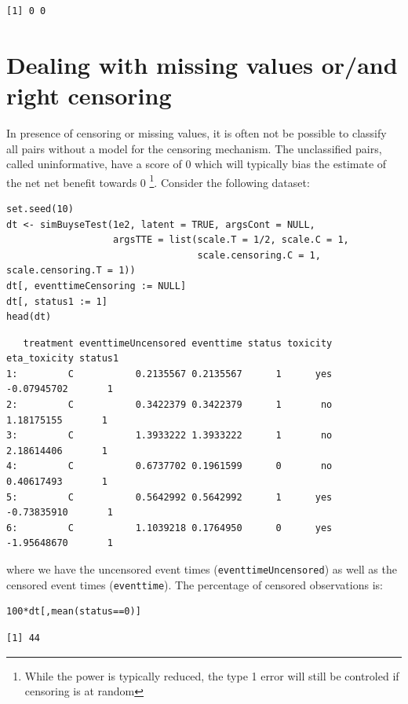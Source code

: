 \documentclass[12pt]{article}
\begin{document}
\begin{verbatim}
[1] 0 0
\end{verbatim}


\clearpage

\section{Dealing with missing values or/and right censoring}
\label{sec:org2e55876}

In presence of censoring or missing values, it is often not be
 possible to classify all pairs without a model for the censoring
 mechanism. The unclassified pairs, called uninformative, have a score
 of 0 which will typically bias the estimate of the net net benefit
 towards 0 \footnote{While the power is typically reduced, the type 1 error
 will still be controled if censoring is at random}. Consider the
 following dataset:
\lstset{language=r,label= ,caption= ,captionpos=b,numbers=none}
\begin{lstlisting}
set.seed(10)
dt <- simBuyseTest(1e2, latent = TRUE, argsCont = NULL,
                   argsTTE = list(scale.T = 1/2, scale.C = 1,
                                  scale.censoring.C = 1, scale.censoring.T = 1))
dt[, eventtimeCensoring := NULL]
dt[, status1 := 1]
head(dt)
\end{lstlisting}

\begin{verbatim}
   treatment eventtimeUncensored eventtime status toxicity eta_toxicity status1
1:         C           0.2135567 0.2135567      1      yes  -0.07945702       1
2:         C           0.3422379 0.3422379      1       no   1.18175155       1
3:         C           1.3933222 1.3933222      1       no   2.18614406       1
4:         C           0.6737702 0.1961599      0       no   0.40617493       1
5:         C           0.5642992 0.5642992      1      yes  -0.73835910       1
6:         C           1.1039218 0.1764950      0      yes  -1.95648670       1
\end{verbatim}


where we have the uncensored event times (\texttt{eventtimeUncensored}) as well as the censored event
times (\texttt{eventtime}). The percentage of censored observations is:
\lstset{language=r,label= ,caption= ,captionpos=b,numbers=none}
\begin{lstlisting}
100*dt[,mean(status==0)]
\end{lstlisting}

\begin{verbatim}
[1] 44
\end{verbatim}
\end{document}

